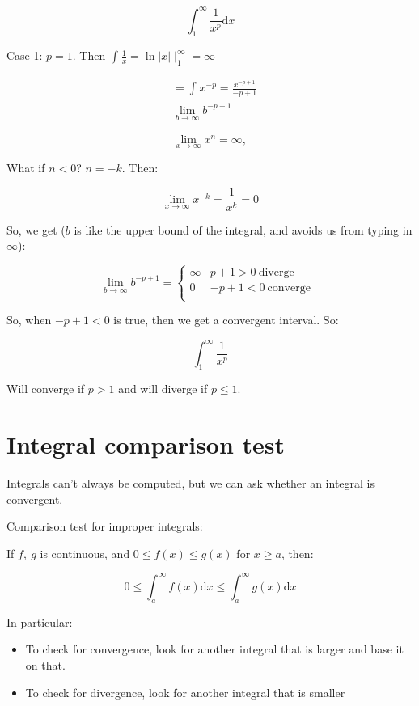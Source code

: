 \documentclass[12pt]{article}
\theoremstyle{plain}
\theoremstyle{remark}
\theoremstyle{definition}
\begin{document}
\[\int_{1}^{\infty}{\frac{1}{x^{p}}\text{d}x}\]

Case 1: \(p = 1\). Then
\(\int_{}^{}\frac{1}{x} = \ln|x| \mid_{1}^{\infty} = \infty\)

\begin{align*}
&= \int_{}^{}x^{- p} = \frac{x^{- p + 1}}{- p + 1} \\
&\lim_{b \rightarrow \infty}b^{- p + 1}
\end{align*}


\[\lim_{x \rightarrow \infty}x^{n} = \infty,\]

What if \(n < 0\)? \(n = - k\). Then:

\[\lim_{x \rightarrow \infty}x^{- k} = \frac{1}{x^{k}} = 0\]

So, we get (\(b\) is like the upper bound of the integral, and avoids us
from typing in \(\infty\)):

\[\lim_{b \rightarrow \infty}b^{- p + 1} = \left\{ \begin{matrix}
\infty & p + 1 > 0\ \text{diverge} \\
0 & - p + 1 < 0\ \text{converge} \\
\end{matrix} \right.\ \ \]

So, when \(- p + 1 < 0\) is true, then we get a convergent interval. So:

\[\int_{1}^{\infty}\frac{1}{x^{p}}\]

Will converge if \(p > 1\) and will diverge if \(p \leq 1\).


\section{Integral comparison test}

Integrals can't always be computed, but we can ask whether an integral
is convergent.

Comparison test for improper integrals:

If \(f,\ g\) is continuous, and \(0 \leq f(x) \leq g(x)\) for
\(x \geq a\), then:

\[0 \leq \int_{a}^{\infty}{f(x)\text{d}x} \leq \int_{a}^{\infty}{g(x)\text{d}x}\]

In particular:

\begin{itemize}
\item
  To check for convergence, look for another integral that is larger and
  base it on that.
\item
  To check for divergence, look for another integral that is smaller
\end{itemize}
\end{document}
